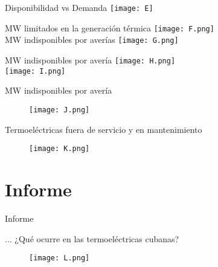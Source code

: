 \documentclass{beamer}
\begin{document}
    
    \begin{frame}{Disponibilidad vs Demanda}
    \centering
    \texttt{[image: E]}
    \end{frame}
   

    \begin{frame}{MW limitados en la generación térmica}
    \texttt{[image: F.png]}\\
    \vspace{1cm}
    \newline 
    MW indisponibles por averías
    \texttt{[image: G.png]}\\
    \end{frame}

    \begin{frame}{MW indisponibles por avería }
    \texttt{[image: H.png]}\\
    \vspace{1cm}
    \texttt{[image: I.png]}\\
    \end{frame}

    \begin{frame}{MW indisponibles por avería}
    \begin{figure}[h]
    \centering
    \texttt{[image: J.png]}
    \end{figure}
    \end{frame}
    
    \begin{frame}{Termoeléctricas fuera de servicio y en mantenimiento}
        \begin{figure}[h]
        \centering
        \texttt{[image: K.png]}
        \end{figure}
    \end{frame}
   
    \section{Informe}
    \begin{frame}{Informe}
        \begin{block}{...}
            ¿Qué ocurre en las termoeléctricas cubanas?
        \end{block}
         \begin{figure}[h]
        \centering
        \texttt{[image: L.png]}
        \end{figure}
    \end{frame}
\end{document}
